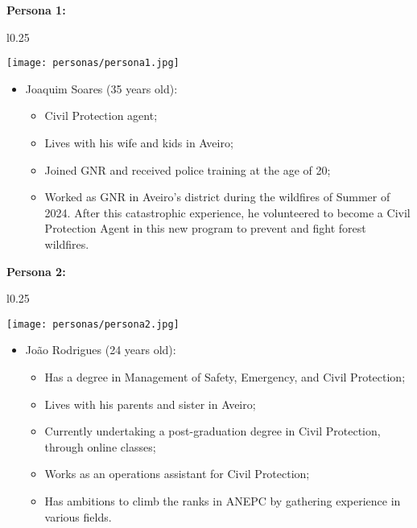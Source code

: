 \textbf{Persona 1:} \\
\begin{wrapfigure}{l}{0.25\textwidth}
    \begin{center}
    \texttt{[image: personas/persona1.jpg]}
    \end{center}
\end{wrapfigure}
\begin{itemize}
    \item Joaquim Soares (35 years old):
    \begin{itemize}
    \item Civil Protection agent;
    \item Lives with his wife and kids in Aveiro;
    \item Joined GNR and received police training at the age of 20;
    \item Worked as GNR in Aveiro's district during the wildfires of 
    Summer of 2024. 
    After this catastrophic experience, he volunteered to become a
    Civil Protection Agent in this new program to prevent and fight forest wildfires. \\
    \end{itemize}
\end{itemize} 

\textbf{Persona 2:} \\
\begin{wrapfigure}{l}{0.25\textwidth}
    \begin{center}
    \texttt{[image: personas/persona2.jpg]}
    \end{center}
\end{wrapfigure}
\begin{itemize}
    \item João Rodrigues (24 years old):
    \begin{itemize}
    \item Has a degree in Management of
    Safety, Emergency, and Civil Protection;
    \item Lives with his parents and sister in Aveiro;
    \item Currently undertaking a post-graduation degree in Civil Protection,
    through online classes;
    \item Works as an operations assistant for Civil Protection; 
    \item Has ambitions to
    climb the ranks in ANEPC by gathering experience in various fields.
    \end{itemize}
\end{itemize}
